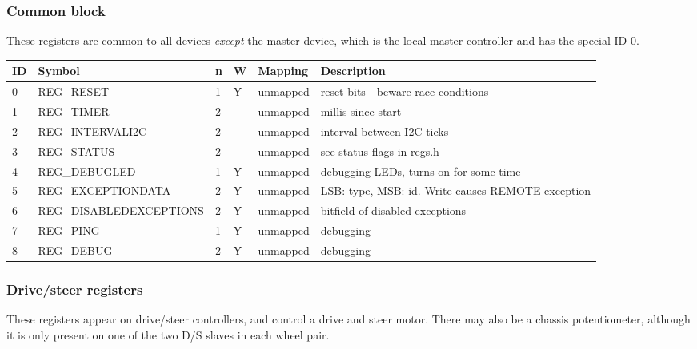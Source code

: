 \subsubsection{Common block}
These registers are common to all devices \emph{except} the master device, which is the local master
controller and has the special ID 0.

\begin{tabular}{|p{0.2in}|p{2.7in}|p{0.1in}|p{0.1in}|p{1in}|p{1.5in}|}\hline
\textbf{ID} & \textbf{Symbol} & \textbf{n} & \textbf{W} & \textbf{Mapping} & \textbf{Description}  \\ \hline 
0 & REG\_RESET & 1 & Y & unmapped & reset bits - beware race conditions\\ \hline
1 & REG\_TIMER & 2 &  & unmapped & millis since start\\ \hline
2 & REG\_INTERVALI2C & 2 &  & unmapped & interval between I2C ticks\\ \hline
3 & REG\_STATUS & 2 &  & unmapped & see status flags in regs.h\\ \hline
4 & REG\_DEBUGLED & 1 & Y & unmapped & debugging LEDs, turns on for some time\\ \hline
5 & REG\_EXCEPTIONDATA & 2 & Y & unmapped & LSB: type, MSB: id. Write causes REMOTE exception\\ \hline
6 & REG\_DISABLEDEXCEPTIONS & 2 & Y & unmapped & bitfield of disabled exceptions\\ \hline
7 & REG\_PING & 1 & Y & unmapped & debugging\\ \hline
8 & REG\_DEBUG & 2 & Y & unmapped & debugging\\ \hline
\end{tabular}

\clearpage
\subsubsection{Drive/steer registers}
These registers appear on drive/steer controllers, and control a drive and steer motor.
There may also be a chassis potentiometer, although it is only present on one of the two D/S slaves
in each wheel pair.

